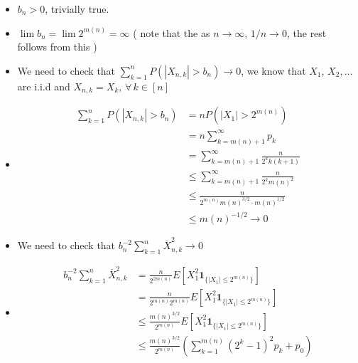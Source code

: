 \documentclass{article}
\newcommand{\bracket}[1]{\left(#1\right)}
\begin{document}
\begin{itemize}
    \item $b_n > 0$, trivially true. 
    \item $\lim b_n = \lim 2^{m(n)} = \infty$ ( note that the as $n \rightarrow \infty$, $1/n \rightarrow 0$, the rest follows from this ) 
    \item We need to check that $\sum_{k=1}^n P(|X_{n, k}| > b_n) \rightarrow 0$, we know that $X_1$, $X_2, \dots$ are i.i.d and $X_{n, k} = X_k, \, \forall \, k\in[n]$
    \item[] \begin{itemize}
                \begin{equation}
                    \label{G11}
                    \begin{split}
                        \sum_{k=1}^n P(|X_{n, k}| > b_n) &= nP(|X_1| > 2^{m(n)})\\
                        &= n \sum_{k = m(n) + 1}^\infty p_k\\
                        &= \sum_{k = m(n) + 1}^\infty \frac{n}{2^k k (k+1)}\\
                        &\leq  \sum_{k = m(n) + 1}^\infty \frac{n}{2^k m(n)^2}\\
                        &\leq \frac{n}{2^{m(n)} m(n)^{3/2} \cdot m(n)^{1/2}}\\ 
                        &\leq m(n)^{-1/2} \rightarrow 0 
                    \end{split}
                \end{equation}
            \end{itemize}
    \item We need to check that $b_n^{-2}\sum_{k=1}^{n} \overline{X}^2_{n, k} \rightarrow 0$
    \item[] \begin{itemize}
                \begin{equation}
                    \label{G12}
                    \begin{split}
                        b_n^{-2}\sum_{k=1}^{n} \overline{X}^2_{n, k} &= \frac{n}{2^{2m(n)}} E\left[X_1^2 \mathbf{1}_{\{|X_1| \leq 2^{m(n)}\}}\right]\\
                        &= \frac{n}{2^{m(n)}2^{m(n)}} E\left[X_1^2 \mathbf{1}_{\{|X_1| \leq 2^{m(n)}\}}\right]\\
                        &\leq \frac{m(n)^{3/2}}{2^{m(n)}} E\left[X_1^2 \mathbf{1}_{\{|X_1| \leq 2^{m(n)}\}}\right]\\
                        &\leq \frac{m(n)^{3/2}}{2^{m(n)}} \bracket{ \sum_{k=1}^{m(n)} (2^k -1)^2 p_k + p_0}\\

\end{split}
\end{equation}
\end{itemize}
\end{itemize}
\end{document}
